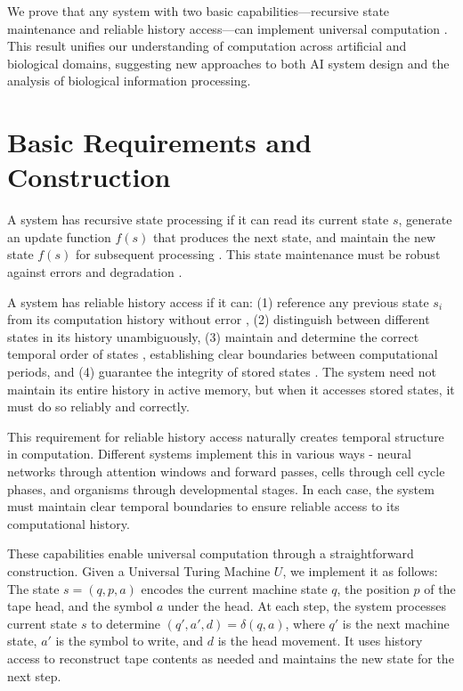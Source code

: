 \documentclass[12pt]{article}
\begin{document}
We prove that any system with two basic capabilities---recursive state maintenance and reliable history access---can implement universal computation \cite{bennett1989time,boyle2024memory}. This result unifies our understanding of computation across artificial and biological domains, suggesting new approaches to both AI system design and the analysis of biological information processing.

\section{Basic Requirements and Construction}
A system has recursive state processing if it can read its current state $s$, generate an update function $f(s)$ that produces the next state, and maintain the new state $f(s)$ for subsequent processing \cite{manuri2019state}. This state maintenance must be robust against errors and degradation \cite{yang2013survey}.

A system has reliable history access if it can: (1) reference any previous state $s_i$ from its computation history without error \cite{fu2024memory}, (2) distinguish between different states in its history unambiguously, (3) maintain and determine the correct temporal order of states \cite{berridge2014cell,pastor2020computation}, establishing clear boundaries between computational periods, and (4) guarantee the integrity of stored states \cite{lovkvist2021using}. The system need not maintain its entire history in active memory, but when it accesses stored states, it must do so reliably and correctly.

This requirement for reliable history access naturally creates temporal structure in computation. Different systems implement this in various ways - neural networks through attention windows and forward passes, cells through cell cycle phases, and organisms through developmental stages. In each case, the system must maintain clear temporal boundaries to ensure reliable access to its computational history.

These capabilities enable universal computation through a straightforward construction. Given a Universal Turing Machine $U$, we implement it as follows: The state $s = (q, p, a)$ encodes the current machine state $q$, the position $p$ of the tape head, and the symbol $a$ under the head. At each step, the system processes current state $s$ to determine $(q', a', d) = \delta(q, a)$, where $q'$ is the next machine state, $a'$ is the symbol to write, and $d$ is the head movement. It uses history access to reconstruct tape contents as needed and maintains the new state for the next step.
\end{document}
